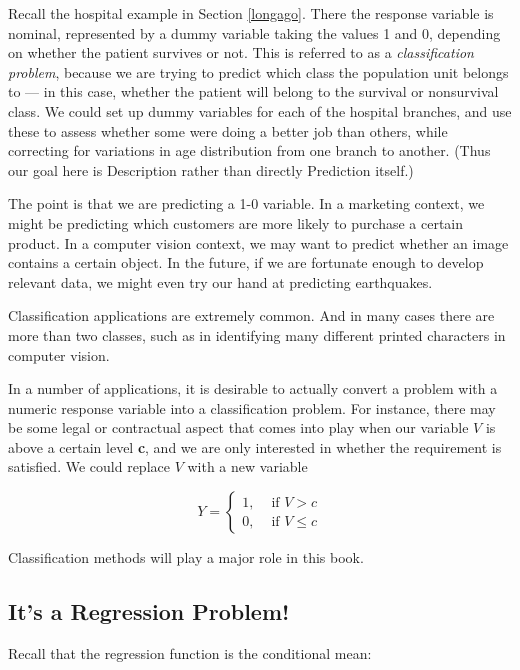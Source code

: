Recall the hospital example in Section \ref{longago}.  There the
response variable is nominal, represented by a dummy variable taking the
values 1 and 0, depending on whether the patient survives or not.  This
is referred to as a {\it classification problem}, because we are trying
to predict which class the population unit belongs to --- in this case,
whether the patient will belong to the survival or nonsurvival class.
We could set up dummy variables for each of the hospital branches, and
use these to assess whether some were doing a better job than others,
while correcting for variations in age distribution from one branch to
another.  (Thus our goal here is Description rather than directly
Prediction itself.)

The point is that we are predicting a 1-0 variable.  In a marketing context,
we might be predicting which customers are more likely to purchase a
certain product.  In a computer vision context, we may want to predict
whether an image contains a certain object.  In the future, if we are
fortunate enough to develop relevant data, we might even try our hand at
predicting earthquakes.

Classification applications are extremely common. And in many cases
there are more than two classes, such as in identifying many different
printed characters in computer vision.

In a number of applications, it is desirable to actually convert a
problem with a numeric response variable into a classification problem.
For instance, there may be some legal or contractual aspect that comes
into play when our variable $V$ is above a certain level {\bf c}, and we
are only interested in whether the requirement is satisfied.  We could
replace $V$ with a new variable

\begin{equation}
Y = 
\begin{cases}
      1, & \textrm{ if } V > c \\
      0, & \textrm{ if } V \leq c 
\end{cases}
\end{equation}

Classification methods will play a major role in this book.

\subsection{It's a Regression Problem!}
\label{classeqreg}

Recall that the regression function is the conditional mean:

